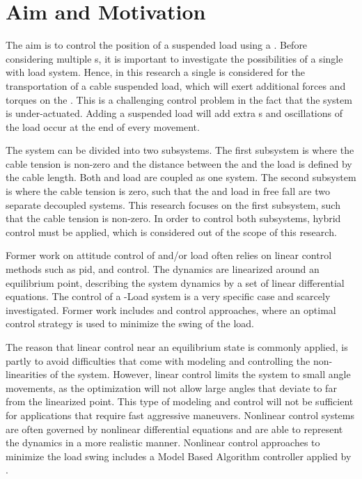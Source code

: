 \section{Aim and Motivation}\label{sec:int.motivation}
The aim is to control the position of a suspended load using a . Before considering multiple s, it is important to investigate the possibilities of a single  with load system. Hence, in this research a single  is considered for the transportation of a cable suspended load, which will exert additional forces and torques on the . This is a challenging control problem in the fact that the  system is under-actuated. Adding a suspended load will add extra s and oscillations of the load occur at the end of every movement. 

The system can be divided into two subsystems. The first subsystem is where the cable tension is non-zero and the distance between the  and the load is defined by the cable length. Both  and load are coupled as one system. The second subsystem is where the cable tension is zero, such that the  and load in free fall are two separate decoupled systems. This research focuses on the first subsystem, such that the cable tension is non-zero. In order to control both subsystems, hybrid control must be applied, which is considered out of the scope of this research.

Former work on attitude control of  and/or load often relies on linear control methods such as \acs{pid},  and  control. The dynamics are linearized around an equilibrium point, describing the system dynamics by a set of linear differential equations. 
The control of a -Load system is a very specific case and scarcely investigated. Former work includes  \cite{PraveenThesis} and  control approaches, where an optimal control strategy is used to minimize the swing of the load. 

The reason that linear control near an equilibrium state is commonly applied, is partly to avoid difficulties that come with modeling and controlling the non-linearities of the system. However, linear control limits the system to small angle movements, as the optimization will not allow large angles that deviate to far from the linearized point.  
This type of modeling and control will not be sufficient for applications that require fast aggressive maneuvers.
Nonlinear control systems are often governed by nonlinear differential equations and are able to represent the dynamics in a more realistic manner. Nonlinear control approaches to minimize the load swing includes a Model Based Algorithm controller applied by \cite{Sadr2014}. 


